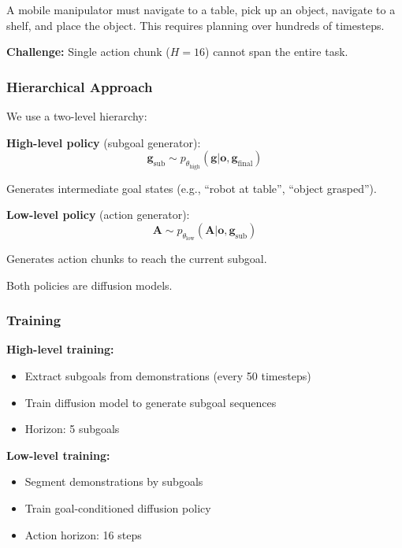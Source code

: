 A mobile manipulator must navigate to a table, pick up an object, navigate to a shelf, and place the object. This requires planning over hundreds of timesteps.

\textbf{Challenge:} Single action chunk ($H = 16$) cannot span the entire task.

\subsubsection{Hierarchical Approach}

We use a two-level hierarchy:

\textbf{High-level policy} (subgoal generator):
\begin{equation}
\mathbf{g}_{\text{sub}} \sim p_{\theta_{\text{high}}}(\mathbf{g} | \mathbf{o}, \mathbf{g}_{\text{final}})
\label{eq:subgoal_policy}
\end{equation}

Generates intermediate goal states (e.g., ``robot at table'', ``object grasped'').

\textbf{Low-level policy} (action generator):
\begin{equation}
\mathbf{A} \sim p_{\theta_{\text{low}}}(\mathbf{A} | \mathbf{o}, \mathbf{g}_{\text{sub}})
\label{eq:low_level_policy}
\end{equation}

Generates action chunks to reach the current subgoal.

Both policies are diffusion models.

\subsubsection{Training}

\textbf{High-level training:}
\begin{itemize}
    \item Extract subgoals from demonstrations (every 50 timesteps)
    \item Train diffusion model to generate subgoal sequences
    \item Horizon: 5 subgoals
\end{itemize}

\textbf{Low-level training:}
\begin{itemize}
    \item Segment demonstrations by subgoals
    \item Train goal-conditioned diffusion policy
    \item Action horizon: 16 steps
\end{itemize}


